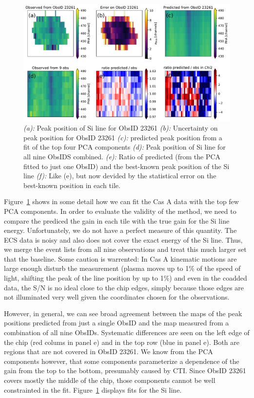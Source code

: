 \documentclass[]{spie}  %
\begin{document}
\begin{figure} [ht]
  \begin{center}
    \includegraphics[width=\textwidth]{figures/Si_23261.pdf}
  \end{center}
  \caption
      {\emph{(a):} Peak position of Si line for ObsID 23261 \emph{(b):} Uncertainty on peak position for ObsID 23261 \emph{(c):} predicted peak position from a fit of the top four PCA components \emph{(d):} Peak position of Si line for all nine ObsIDS combined. \emph{(e):} Ratio of predicted (from the PCA fitted to just one ObsID) and the best-known peak position of the Si line \emph{(f):} Like (e), but now devided by the statistical error on the best-known position in each tile.        \label{fig:Si23261}}
\end{figure}

Figure~\ref{fig:Si23261} shows in some detail how we can fit the Cas A data with the top few PCA components. In order to evaluate the validity of the method, we need to compare the prediced the gain in each tile with the true gain for the Si line energy. Unfortunately, we do not have a perfect measure of this quantity. The ECS data is noisy and also does not cover the exact energy of the Si line. Thus, we merge the event lists from all nine observations and treat this much larger set that the baseline. Some caution is warrented: In Cas A kinematic motions are large enough disturb the measurement (plasma moves up to 1\% of the speed of light, shifting the peak of the line position by up to 1\%) and even in the coadded data, the S/N is no ideal close to the chip edges, simply because those edges are not illuminated very well given the coordinates chosen for the observations.

However, in general, we can see broad agreement between the maps of the peak positions predicted from just a single ObsID and the map measured from a combination of all nine ObsIDs. Systematic differences are seen on the left edge of the chip (red colums in panel e) and in the top row (blue in panel e). Both are regions that are not covered in ObsID 23261. We know from the PCA components however, that some components parameterize a dependence of the gain from the top to the bottom, presumably caused by CTI. Since ObsID 23261 covers mostly the middle of the chip, those components cannot be well constrainted in the fit. Figure~\ref{fig:Si23261} displays fits for the Si line.
\end{document}
